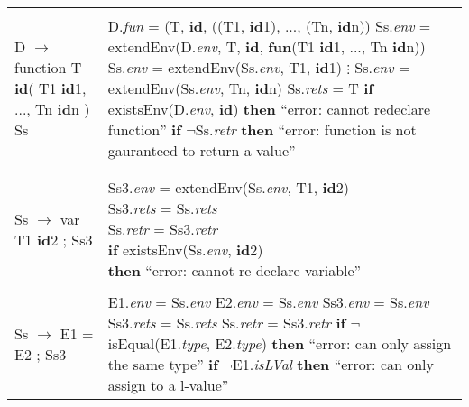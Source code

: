 \documentclass{article}
\begin{document}
\begin{center}
\begin{longtable}{ |l|l| }
     & \\
    
    \hline
    
     & \\
    
    D $\rightarrow$ function T \textbf{id}( T1 \textbf{id}1, ..., Tn \textbf{id}n ) { Ss } & \makecell[l]{D.\textit{fun} = (T, \textbf{id}, ((T1, \textbf{id}1), ..., (Tn, \textbf{id}n)) \\ Ss.\textit{env} = \\ $\quad$ extendEnv(D.\textit{env}, T, \textbf{id}, \textbf{fun}(T1 \textbf{id}1, ..., Tn \textbf{id}n)) \\ Ss.\textit{env} = extendEnv(Ss.\textit{env}, T1, \textbf{id}1) \\ $\vdots$ \\ Ss.\textit{env} = extendEnv(Ss.\textit{env}, Tn, \textbf{id}n) \\ Ss.\textit{rets} = T \\ \textbf{if} existsEnv(D.\textit{env}, \textbf{id}) \\ \textbf{then} ``error: cannot redeclare function'' \\ \textbf{if} $\neg$Ss.\textit{retr} \\ \textbf{then} ``error: function is not gauranteed to return a value''} \\
    
     & \\
    
    \hline
    
     & \\
    
    Ss $\rightarrow$ var T1 \textbf{id}2 ; Ss3 & \makecell[l]{Ss3.\textit{env} = extendEnv(Ss.\textit{env}, T1, \textbf{id}2)  \\ Ss3.\textit{rets} = Ss.\textit{rets} \\ Ss.\textit{retr} = Ss3.\textit{retr} \\ \textbf{if} existsEnv(Ss.\textit{env}, \textbf{id}2) \\ \textbf{then} ``error: cannot re-declare variable''} \\ 
    
     & \\
     
    Ss $\rightarrow$ E1 = E2 ; Ss3 & \makecell[l]{E1.\textit{env} = Ss.\textit{env} \\ E2.\textit{env} = Ss.\textit{env} \\ Ss3.\textit{env} = Ss.\textit{env} \\ Ss3.\textit{rets} = Ss.\textit{rets} \\ Ss.\textit{retr} = Ss3.\textit{retr} \\ \textbf{if} $\neg$isEqual(E1.\textit{type}, E2.\textit{type}) \\ \textbf{then} ``error: can only assign the same type'' \\ \textbf{if} $\neg$E1.\textit{isLVal} \\ \textbf{then} ``error: can only assign to a l-value''} \\
    

\end{longtable}
\end{center}
\end{document}
